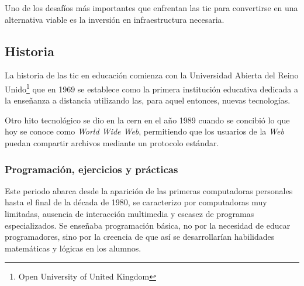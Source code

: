 Uno de los desafíos más importantes que enfrentan las \Gls{tic} para convertirse
en una alternativa viable es la inversión en infraestructura
necesaria\cite{unesco:ict}. 

\subsection{Historia}


La historia de las \Gls{tic} en educación comienza con la Universidad Abierta
del Reino Unido\footnote{Open University of United Kingdom} que en 1969 se
establece como la primera institución educativa dedicada a la enseñanza a
distancia utilizando las, para aquel entonces, nuevas
tecnologías\cite{tinio:ict}.



Otro hito tecnológico se dio en la \Gls{cern} en el año 1989 cuando se concibió
lo que hoy se conoce como \emph{World Wide Web}, permitiendo que los usuarios de
la \emph{Web} puedan compartir archivos mediante un protocolo
estándar\cite{white:ict}. 


\subsubsection{Programación, ejercicios y prácticas}


Este periodo abarca desde la aparición de las primeras computadoras
personales hasta el final de la década de 1980, se caracterizo por
computadoras muy limitadas, ausencia de interacción multimedia y escasez de
programas especializados. Se enseñaba programación básica\cite{leinonen:ict}, no
por la necesidad de educar programadores, sino por la creencia de que así se
desarrollarían habilidades matemáticas y lógicas en los alumnos. 



